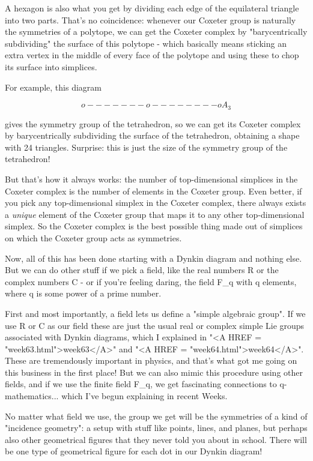 A hexagon is also what you get by dividing each edge of the equilateral
triangle into two parts.  That's no coincidence: whenever our Coxeter
group is naturally the symmetries of a polytope, we can get the Coxeter
complex by "barycentrically subdividing" the surface of this polytope -
which basically means sticking an extra vertex in the middle of every
face of the polytope and using these to chop its surface into simplices.

For example, this diagram


$$

                       o-------o--------o              A_{3}
$$
    
gives the symmetry group of the tetrahedron, so we can get its Coxeter
complex by barycentrically subdividing the surface of the tetrahedron,
obtaining a shape with 24 triangles.  Surprise: this is just the size
of the symmetry group of the tetrahedron!  

But that's how it always works: the number of top-dimensional simplices
in the Coxeter complex is the number of elements in the Coxeter group. 
Even better, if you pick any top-dimensional simplex in the Coxeter
complex, there always exists a \emph{unique} element of the Coxeter group
that maps it to any other top-dimensional simplex.   So the Coxeter
complex is the best possible thing made out of simplices on which the
Coxeter group acts as symmetries.

Now, all of this has been done starting with a Dynkin diagram and
nothing else.  But we can do other stuff if we pick a field, like the
real numbers R or the complex numbers C - or if you're feeling daring,
the field F_{q} with q elements, where q is some power of a prime number.

First and most importantly, a field lets us define a "simple algebraic
group".  If we use R or C as our field these are just the usual real
or complex simple Lie groups associated with Dynkin diagrams, which 
I explained in "<A HREF = "week63.html">week63</A>" and "<A HREF = "week64.html">week64</A>".  These are tremendously important 
in physics, and that's what got me going on this business in the first
place!   But we can also mimic this procedure using other fields, and 
if we use the finite field F_{q}, we get fascinating connections to 
q-mathematics... which I've begun explaining in recent Weeks.  

No matter what field we use, the group we get will be the symmetries 
of a kind of "incidence geometry": a setup with stuff like points, 
lines, and planes, but perhaps also other geometrical figures
that they never told you about in school.  There will be one type
of geometrical figure for each dot in our Dynkin diagram!

